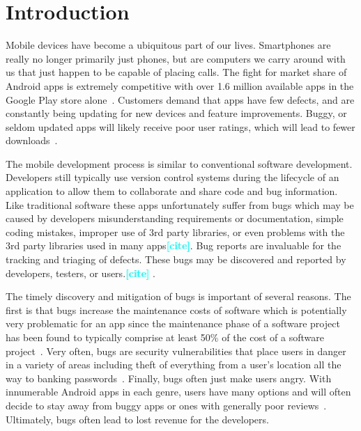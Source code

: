 \documentclass{sig-alternate}
\newcommand{\todo}[1]{\textcolor{cyan}{\textbf{[#1]}}}
\begin{document}
\section{Introduction}


Mobile devices have become a ubiquitous part of our lives. Smartphones are really no longer primarily just phones, but are computers we carry around with us that just happen to be capable of placing calls. The fight for market share of Android apps is extremely competitive with over 1.6 million available apps in the Google Play store alone~\cite{AndroidStats_URL}. Customers demand that apps have few defects, and are constantly being updating for new devices and feature improvements. Buggy, or seldom updated apps will likely receive poor user ratings, which will lead to fewer downloads~\cite{Khalid2014}.

The mobile development process is similar to conventional software development. Developers still typically use version control systems during the lifecycle of an application to allow them to collaborate and share code and bug information. Like traditional software these apps unfortunately suffer from bugs which may be caused by developers misunderstanding requirements or documentation, simple coding mistakes, improper use of 3rd party libraries, or even problems with the 3rd party libraries used in many apps\todo{cite}. Bug reports are invaluable for the tracking and triaging of defects. These bugs may be discovered and reported by developers, testers, or users.\todo{cite} .

The timely discovery and mitigation of bugs is important of several reasons. The first is that bugs increase the maintenance costs of software which is potentially very problematic for an app since the maintenance phase of a software project has been found to typically comprise at least 50\% of the cost of a software project~\cite{SMR:SMR225}. Very often, bugs are security vulnerabilities that place users in danger in a variety of areas including theft of everything from a user's location all the way to banking passwords~\cite{Shahriar:2014:CPL:2659651.2659716}. Finally, bugs often just make users angry. With innumerable Android apps in each genre, users have many options and will often decide to stay away from buggy apps or ones with generally poor reviews~\cite{Vasa:2012:PAM:2414536.2414577}. Ultimately, bugs often lead to lost revenue for the developers.
\end{document}
